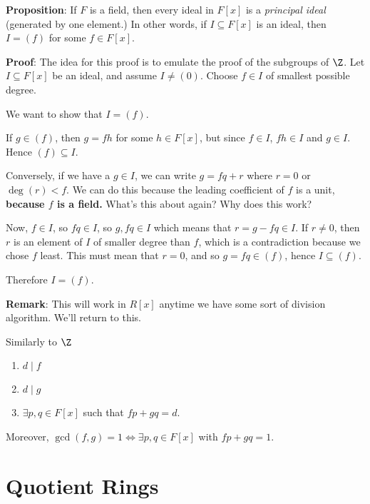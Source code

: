 \documentclass[12pt]{article}
\begin{document}
{\bf Proposition}: If $F$ is a field, then every ideal in $F[x]$ is a {\it
principal ideal} (generated by one element.) In other words, if $I \subseteq
F[x]$ is an ideal, then $I = (f)$ for some $f \in F[x]$.

{\bf Proof}: The idea for this proof is to emulate the proof of the subgroups of
$\Z$. Let $I \subseteq F[x]$ be an ideal, and assume $I \ne (0)$. Choose $f \in
I$ of smallest possible degree.

We want to show that $I = (f)$.

If $g \in (f)$, then $g = fh$ for some $h \in F[x]$, but since $f \in I$, $fh
\in I$ and $g \in I$. Hence $(f) \subseteq I$.

Conversely, if we have a $g \in I$, we can write $g = fq + r$ where $r = 0$ or
$\deg(r) < f$. We can do this because the leading coefficient of $f$ is a unit,
{\bf because $f$ is a field.} \QUESTION{} What's this about again? Why does this
work?

Now, $f \in I$, so $fq \in I$, so $g, fq \in I$ which means that $r = g - fq \in
I$. If $r \ne 0$, then $r$ is an element of $I$ of smaller degree than $f$,
which is a contradiction because we chose $f$ least. This must mean that $r =
0$, and so $g = fq \in (f)$, hence $I \subseteq (f)$.

Therefore $I = (f)$.

{\bf Remark}: This will work in $R[x]$ anytime we have some sort of division
algorithm. We'll return to this.


Similarly to $\Z$

\begin{enumerate}
  \item $d \mid f$
  \item $d \mid g$
  \item $\exists p, q \in F[x]$ such that $fp + gq = d$.
\end{enumerate}

Moreover, $\gcd(f, g) = 1 \Leftrightarrow \exists p, q \in F[x]$ with $fp + gq =
1$.

\section{Quotient Rings}
\end{document}

